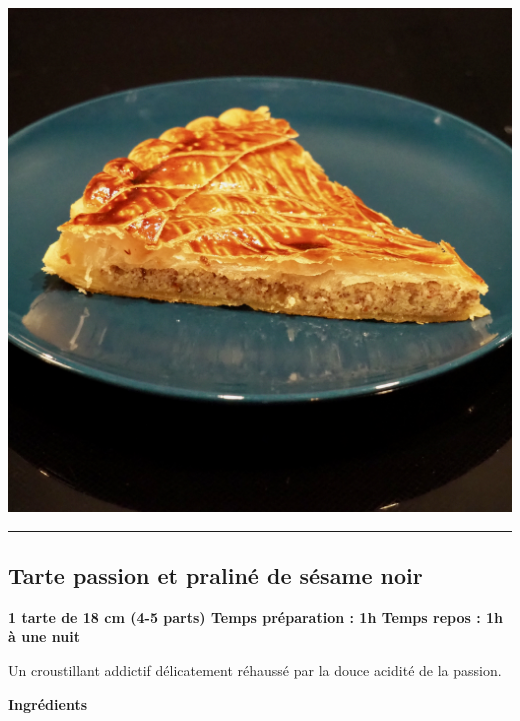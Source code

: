 \documentclass[]{book}
\begin{document}
\begin{center}\includegraphics[width=0.9\linewidth]{photos/galette2} \end{center}

\begin{center}\rule{0.5\linewidth}{0.5pt}\end{center}

\subsection*{\texorpdfstring{{Tarte passion et praliné de sésame
noir}}{Tarte passion et praliné de sésame noir}}\label{tarte-passion-et-pralinuxe9-de-suxe9same-noir}

\begin{sucrebox}
\textbf{1 tarte de 18 cm (4-5 parts) \textbar{} Temps préparation : 1h
\textbar{} Temps repos : 1h à une nuit}

Un croustillant addictif délicatement réhaussé par la douce acidité de
la passion.
\end{sucrebox}

\textbf{Ingrédients}
\end{document}
